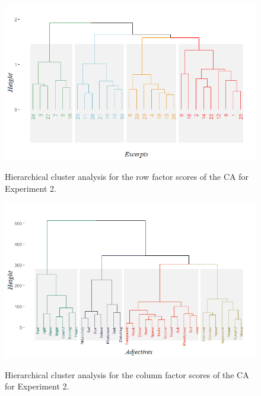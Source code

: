 \documentclass[
]{article}
\begin{document}
\begin{figure}   
  \centering  
  \caption{Hierarchical cluster analysis for the row factor scores of the CA for Experiment 2.}
    \includegraphics{./supmatsimgs/ahca1.png}
  \label{fig:ahca1}
\end{figure}

\begin{figure}   
  \centering  
  \caption{Hierarchical cluster analysis for the column factor scores of the CA for Experiment 2.}
    \includegraphics{./supmatsimgs/ahca2.png}
  \label{fig:ahca2}
\end{figure}
\end{document}
